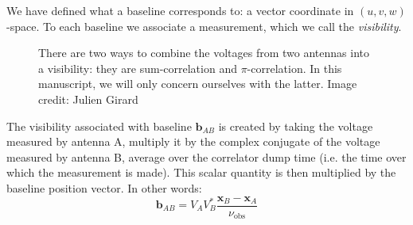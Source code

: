 \pg
We have defined what a baseline corresponds to: a vector coordinate in $(u,v,w)$-space. To each baseline we associate a measurement, which we call the \emph{visibility}. 
\begin{figure}[h]
\centering
{}
\caption{\label{fig.visibility} There are two ways to combine the voltages from two antennas into a visibility: they are sum-correlation and $\pi$-correlation. In this manuscript, we will only concern ourselves with the latter. Image credit: Julien Girard}
\end{figure}
The visibility associated with baseline $\mathbf{b}_{AB}$ is created by taking the voltage measured by antenna A, multiply it by the complex conjugate of the voltage measured by antenna B, average over the correlator dump time (i.e. the time over which the measurement is made). This scalar quantity is then multiplied by the baseline position vector. In other words:
\begin{equation}
\mathbf{b}_{AB} = V_{A} V_{B}^* \frac{\mathbf{x}_{B}-\mathbf{x}_{A}}{\nu_\mathrm{obs}}
\end{equation}

